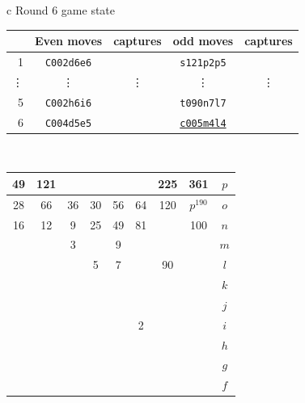 \documentclass[12pt]{article}
\begin{document}
{\small{
\begin{tabular}{c}
Round 6 game state \\      
\begin{tabular}{r|cc|cc}
    & Even moves     &  captures     & odd moves    & captures \\    \hline 
1   &  {\tt C002d6e6} & \quad &  {\tt s121p2p5} & \quad \\
\vdots &  \vdots    & \vdots  & \vdots    & \vdots \\  
5   &  {\tt C002h6i6} & \quad &  {\tt t090n7l7} & \quad \\
6   &  {\tt C004d5e5} & \quad &   \underline{\tt c005m4l4}  & \quad \\
\end{tabular}
\\
\begin{tabular}{|c|c|c|c|c|c|c|c||c} \hline
\squadfill{\,}49 & \squadfill{\,}121 & \quad & \quad & \quad & \quad & \squadfill{\,}225 & \squadfill{\,}361 & $p$ \\ \hline
\squadfill{\,}28 & \squadfill{\,}66 & \trianglepafill{\,}36 & \trianglepafill{\,}30 & \trianglepafill{\,}56 & \trianglepafill{\,}64 & \squadfill{\,}120 & \rhombusfill{\,}$p^{190}$ & $o$ \\ \hline
\trianglepafill{\,}16 & \trianglepafill{\,}12 & \circletfill{\,}9 & \circletfill{\,}25 & \circletfill{\,}49 & \circletfill{\,}81 & \quad & \trianglepafill{\,}100 & $n$ \\ \hline
\quad & \quad & \circletfill{\,}3 & \quad & \circletfill{\,}9 & \quad & \quad & \quad & $m$ \\ \hline
\quad & \quad & \quad & \circletfill{\,}5 & \circletfill{\,}7 & \quad & \trianglepafill{\,}90 & \quad & $l$ \\ \hline
\quad & \quad & \quad & \quad & \quad & \quad & \quad & \quad & $k$ \\ \hline
\quad & \quad & \quad & \quad & \quad & \quad & \quad & \quad & $j$ \\ \hline
\quad & \quad & \quad & \quad & \quad & \circlet{\,}2 & \quad & \quad & $i$ \\ \hline
\quad & \quad & \quad & \quad & \quad & \quad & \quad & \quad & $h$ \\ \hline
\quad & \quad & \quad & \quad & \quad & \quad & \quad & \quad & $g$ \\ \hline
\quad & \quad & \quad & \quad & \quad & \quad & \quad & \quad & $f$ \\ \hline

\end{tabular}
\end{tabular}}}
\end{document}
